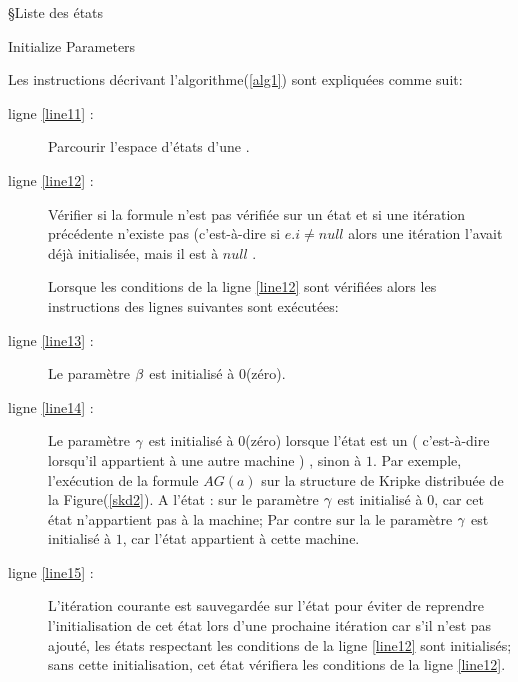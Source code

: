 \begin{algorithm}[H]\label{alg1}
\SetAlgoLined
{}
\S{Liste des états}
 \caption{Initialize Parameters}
\end{algorithm}
Les instructions décrivant l'algorithme(\ref{alg1}) sont expliquées comme suit:
\begin{description}
	\item[ligne \ref{line11} :] Parcourir l'espace d'états d'une \mi{}.
	\item[ligne \ref{line12} :] Vérifier si la formule n'est pas vérifiée sur un état et si une itération précédente n'existe pas (c'est-à-dire si $ e.i\ne null$ alors une itération l'avait déjà initialisée, mais il est à $ null$ . 
	
	Lorsque les conditions de la ligne \ref{line12} sont vérifiées alors les instructions des lignes suivantes sont exécutées:
	\item[ligne \ref{line13} :] Le paramètre $\beta{}$ est initialisé à $0$(zéro).
	\item[ligne \ref{line14} :] Le paramètre $\gamma{}$ est initialisé à $0$(zéro) lorsque l'état est un \textsl{\border{}} ( c'est-à-dire lorsqu'il appartient à une autre machine ) , sinon à $1$. Par exemple, l'exécution de la formule  \textit{$AG(a)$} sur la structure de Kripke distribuée de la Figure(\ref{skd2}). A l'état \sneuf{} : sur \mone{}  le paramètre $\gamma{}$ est initialisé à $0$, car cet état n'appartient pas à la machine;  Par contre sur la \mtwo{} le paramètre $\gamma{}$ est initialisé à $1$, car l'état appartient à cette machine.
	\item[ligne \ref{line15} :] L'itération courante est sauvegardée sur l'état pour éviter de reprendre l'initialisation de cet état lors d'une prochaine itération car s'il n'est pas ajouté, les états respectant les conditions de la ligne \ref{line12} sont initialisés; sans cette initialisation, cet état vérifiera les conditions de la ligne \ref{line12}. 
\end{description}

